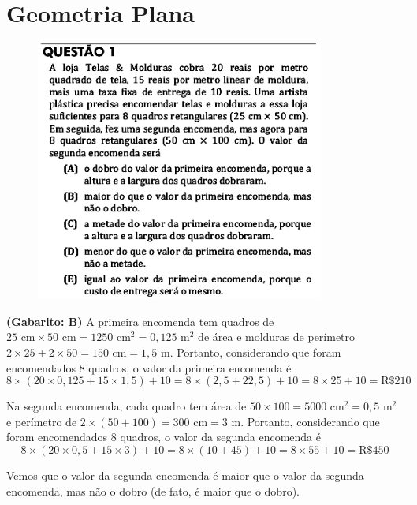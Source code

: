 \documentclass[a4paper]{article}
\begin{document}
\section{Geometria Plana}
\begin{figure}[H]
	\begin{center}
		\includegraphics[width=9.5cm]{L5Q1.png}
	\end{center}
\end{figure}
\par\textbf{(Gabarito: B)} A primeira encomenda tem quadros de $25\text{ cm}\times 50\text{ cm} = 1250\text{ cm}^2 = 0,125\text{ m}^2$ de área e molduras de perímetro $2\times 25 + 2\times 50 = 150\text{ cm} = 1,5\text{ m}$. Portanto, considerando que foram encomendados $8$ quadros, o valor da primeira encomenda é
\begin{equation*}
8\times ( 20\times 0,125 + 15\times 1,5 ) + 10 = 8\times (2,5 + 22,5) + 10 = 8\times 25 + 10 = \text{R\$}210
\end{equation*}
\par\vspace{0.3cm} Na segunda encomenda, cada quadro tem área de $50\times 100 = 5000\text{ cm}^2 = 0,5\text{ m}^2$ e perímetro de $2\times (50+100) = 300\text{ cm} = 3\text{ m}$. Portanto, considerando que foram encomendados $8$ quadros, o valor da segunda encomenda é
\begin{equation*}
8\times (20\times 0,5 + 15\times 3) + 10 = 8\times (10 + 45) + 10 = 8\times 55 + 10 = \text{R\$}450
\end{equation*}
\par\vspace{0.3cm} Vemos que o valor da segunda encomenda é maior que o valor da segunda encomenda, mas não o dobro (de fato, é maior que o dobro).
\end{document}
